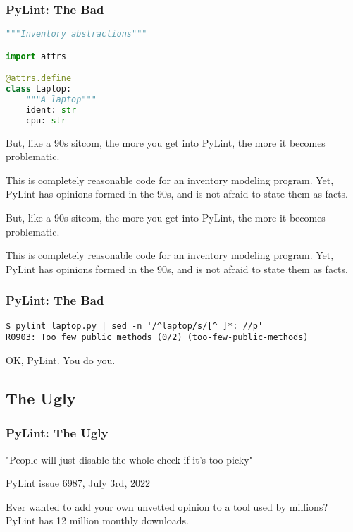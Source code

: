 \documentclass{article}
\begin{document}
\begin{frame}[fragile]
\frametitle{PyLint: The Bad}

\begin{lstlisting}[language=Python]
"""Inventory abstractions"""

import attrs

@attrs.define
class Laptop:
    """A laptop"""
    ident: str
    cpu: str
\end{lstlisting}

\end{frame}

But, like a 90s sitcom, the more you get into PyLint, the more it
becomes problematic.

This is completely reasonable code for an inventory modeling program.
Yet, PyLint has opinions formed in the 90s, and is not afraid to state
them as facts.

But, like a 90s sitcom, the more you get into PyLint, the more it
becomes problematic.

This is completely reasonable code for an inventory modeling program.
Yet, PyLint has opinions formed in the 90s, and is not afraid to state
them as facts.

\begin{frame}[fragile]
\frametitle{PyLint: The Bad}

\begin{lstlisting}
$ pylint laptop.py | sed -n '/^laptop/s/[^ ]*: //p'
R0903: Too few public methods (0/2) (too-few-public-methods)
\end{lstlisting}

\end{frame}

OK, PyLint. You do you.

\hypertarget{the-ugly}{%
\subsection{The Ugly}\label{the-ugly}}

\begin{frame}[fragile]
\frametitle{PyLint: The Ugly}

"People will just disable the whole check if it's too picky"

PyLint issue 6987, July 3rd, 2022

\end{frame}

Ever wanted to add your own unvetted opinion to a tool used by millions?
PyLint has 12 million monthly downloads.
\end{document}
